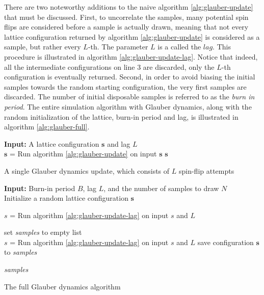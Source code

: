 \documentclass[12pt]{article}
\begin{document}
There are two noteworthy additions to the naive algorithm \ref{alg:glauber-update} that must be discussed. First, to uncorrelate the samples, many potential spin flips are considered before a sample is actually drawn, meaning that not every lattice configuration returned by algorithm \ref{alg:glauber-update} is considered as a sample, but rather every $L$-th. The parameter $L$ is a called the $lag$. This procedure is illustrated in algorithm \ref{alg:glauber-update-lag}. Notice that indeed, all the intermediate configurations on line $3$ are discarded,  only the $L$-th configuration is eventually returned. Second, in order to avoid biasing the initial samples towards the random starting configuration, the very first samples are discarded. The number of initial disposable samples is referred to as the \textit{burn in period}. The entire simulation algorithm with Glauber dynamics, along with the random initialization of the lattice, burn-in period and lag, is illustrated in algorithm \ref{alg:glauber-full}.

\begin{algorithm}
\textbf{Input:} A lattice configuration $\boldsymbol{s}$ and lag $L$ \\
 {
	$\boldsymbol{s}$ = Run algorithm \ref{alg:glauber-update} on input $\boldsymbol{s}$\;
}
\Return $\boldsymbol{s}$\;
\caption{A single Glauber dynamics update, which consists of $L$ spin-flip attempts}
\label{alg:glauber-update-lag}
\end{algorithm}

\begin{algorithm}
\textbf{Input:} Burn-in period $B$, lag $L$, and the number of samples to draw $N$ \\ 
Initialize a random lattice configuration $\boldsymbol{s}$\;

 {  
	$s$ = Run algorithm \ref{alg:glauber-update-lag} on input $s$ and $L$\;
}

set \textit{samples} to empty list  \\
 {
	$s$ = Run algorithm \ref{alg:glauber-update-lag} on input $s$ and $L$\;
	save configuration $\boldsymbol{s}$ to \textit{samples}\;
}

\Return \textit{samples}
\caption{The full Glauber dynamics algorithm}
\label{alg:glauber-full}
\end{algorithm}
\end{document}
